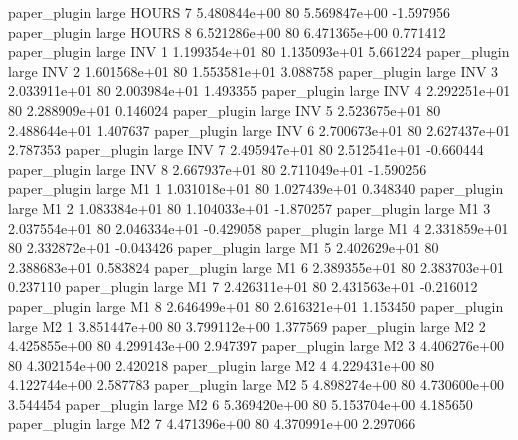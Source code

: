        paper_plugin      large    HOURS                 7 5.480844e+00 80   5.569847e+00          -1.597956
       paper_plugin      large    HOURS                 8 6.521286e+00 80   6.471365e+00           0.771412
       paper_plugin      large      INV                 1 1.199354e+01 80   1.135093e+01           5.661224
       paper_plugin      large      INV                 2 1.601568e+01 80   1.553581e+01           3.088758
       paper_plugin      large      INV                 3 2.033911e+01 80   2.003984e+01           1.493355
       paper_plugin      large      INV                 4 2.292251e+01 80   2.288909e+01           0.146024
       paper_plugin      large      INV                 5 2.523675e+01 80   2.488644e+01           1.407637
       paper_plugin      large      INV                 6 2.700673e+01 80   2.627437e+01           2.787353
       paper_plugin      large      INV                 7 2.495947e+01 80   2.512541e+01          -0.660444
       paper_plugin      large      INV                 8 2.667937e+01 80   2.711049e+01          -1.590256
       paper_plugin      large       M1                 1 1.031018e+01 80   1.027439e+01           0.348340
       paper_plugin      large       M1                 2 1.083384e+01 80   1.104033e+01          -1.870257
       paper_plugin      large       M1                 3 2.037554e+01 80   2.046334e+01          -0.429058
       paper_plugin      large       M1                 4 2.331859e+01 80   2.332872e+01          -0.043426
       paper_plugin      large       M1                 5 2.402629e+01 80   2.388683e+01           0.583824
       paper_plugin      large       M1                 6 2.389355e+01 80   2.383703e+01           0.237110
       paper_plugin      large       M1                 7 2.426311e+01 80   2.431563e+01          -0.216012
       paper_plugin      large       M1                 8 2.646499e+01 80   2.616321e+01           1.153450
       paper_plugin      large       M2                 1 3.851447e+00 80   3.799112e+00           1.377569
       paper_plugin      large       M2                 2 4.425855e+00 80   4.299143e+00           2.947397
       paper_plugin      large       M2                 3 4.406276e+00 80   4.302154e+00           2.420218
       paper_plugin      large       M2                 4 4.229431e+00 80   4.122744e+00           2.587783
       paper_plugin      large       M2                 5 4.898274e+00 80   4.730600e+00           3.544454
       paper_plugin      large       M2                 6 5.369420e+00 80   5.153704e+00           4.185650
       paper_plugin      large       M2                 7 4.471396e+00 80   4.370991e+00           2.297066
